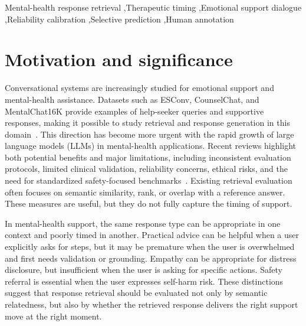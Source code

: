 \documentclass[preprint,12pt,a4paper]{elsarticle}
\begin{document}
\begin{frontmatter}
\begin{abstract}
TheraTime is intended for screening, comparative analysis, error inspection, and human-review support. It is not a reliable final automatic judge, is not a clinical decision-support system, and is not validated for deployment with real users.
\end{abstract}

\begin{keyword}
Mental-health response retrieval \sep Therapeutic timing \sep Emotional support dialogue \sep Reliability calibration \sep Selective prediction \sep Human annotation
\end{keyword}

\end{frontmatter}


\section{Motivation and significance}
\label{sec:intro}

Conversational systems are increasingly studied for emotional support and mental-health assistance. Datasets such as ESConv, CounselChat, and MentalChat16K provide examples of help-seeker queries and supportive responses, making it possible to study retrieval and response generation in this domain~\cite{Liu2021ESConv,Bertagnolli2018CounselChat,Xu2025MentalChat16K}. This direction has become more urgent with the rapid growth of large language models (LLMs) in mental-health applications. Recent reviews highlight both potential benefits and major limitations, including inconsistent evaluation protocols, limited clinical validation, reliability concerns, ethical risks, and the need for standardized safety-focused benchmarks~\cite{Guo2024LLMMentalHealth,Hua2025ScopingLLMMentalHealth,Voultsiou2026LLMMentalHealth}. Existing retrieval evaluation often focuses on semantic similarity, rank, or overlap with a reference answer. These measures are useful, but they do not fully capture the timing of support.

In mental-health support, the same response type can be appropriate in one context and poorly timed in another. Practical advice can be helpful when a user explicitly asks for steps, but it may be premature when the user is overwhelmed and first needs validation or grounding. Empathy can be appropriate for distress disclosure, but insufficient when the user is asking for specific actions. Safety referral is essential when the user expresses self-harm risk. These distinctions suggest that response retrieval should be evaluated not only by semantic relatedness, but also by whether the retrieved response delivers the right support move at the right moment.
\end{document}
